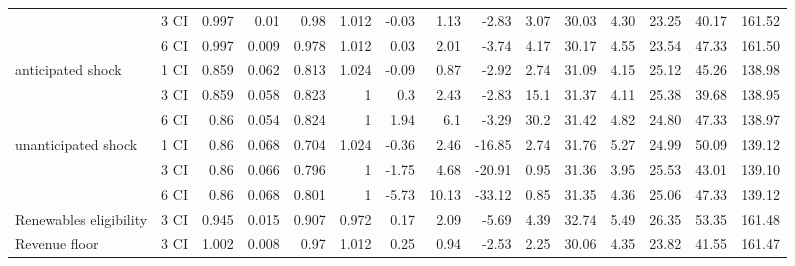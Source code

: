 \begin{tabular}{ll*{13}{r}}
              & 3 CI &                    0.997 &   0.01 &   0.98 &  1.012 &                   -0.03 &   1.13 &  -2.83 &  3.07 &          30.03 &  4.30 &  23.25 &  40.17 &                 161.52 \\
              & 6 CI &                    0.997 &  0.009 &  0.978 &  1.012 &                    0.03 &   2.01 &  -3.74 &  4.17 &          30.17 &  4.55 &  23.54 &  47.33 &                 161.50 \\
anticipated shock & 1 CI &                    0.859 &  0.062 &  0.813 &  1.024 &                   -0.09 &   0.87 &  -2.92 &  2.74 &          31.09 &  4.15 &  25.12 &  45.26 &                 138.98 \\
              & 3 CI &                    0.859 &  0.058 &  0.823 &      1 &                     0.3 &   2.43 &  -2.83 &  15.1 &          31.37 &  4.11 &  25.38 &  39.68 &                 138.95 \\
              & 6 CI &                     0.86 &  0.054 &  0.824 &      1 &                    1.94 &    6.1 &  -3.29 &  30.2 &          31.42 &  4.82 &  24.80 &  47.33 &                 138.97 \\
unanticipated shock & 1 CI &                     0.86 &  0.068 &  0.704 &  1.024 &                   -0.36 &   2.46 & -16.85 &  2.74 &          31.76 &  5.27 &  24.99 &  50.09 &                 139.12 \\
              & 3 CI &                     0.86 &  0.066 &  0.796 &      1 &                   -1.75 &   4.68 & -20.91 &  0.95 &          31.36 &  3.95 &  25.53 &  43.01 &                 139.10 \\
              & 6 CI &                     0.86 &  0.068 &  0.801 &      1 &                   -5.73 &  10.13 & -33.12 &  0.85 &          31.35 &  4.36 &  25.06 &  47.33 &                 139.12 \\
Renewables eligibility & 3 CI &                    0.945 &  0.015 &  0.907 &  0.972 &                    0.17 &   2.09 &  -5.69 &  4.39 &          32.74 &  5.49 &  26.35 &  53.35 &                 161.48 \\
Revenue floor & 3 CI &                    1.002 &  0.008 &   0.97 &  1.012 &                    0.25 &   0.94 &  -2.53 &  2.25 &          30.06 &  4.35 &  23.82 &  41.55 &                 161.47 \\
\bottomrule
\end{tabular}
